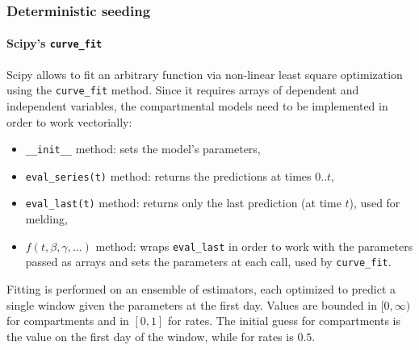 \documentclass[aspectratio=43]{beamer}
\begin{document}
\begin{frame}
	\frametitle{Deterministic seeding}
	\framesubtitle{Scipy's \texttt{curve\_fit}}
	Scipy allows to fit an arbitrary function via non-linear least square optimization using the \texttt{curve\_fit} method.
	Since it requires arrays of dependent and independent variables, the compartmental models need to be implemented in order to work vectorially:
	\begin{itemize}
		\item \texttt{\_\_init\_\_} method: sets the model's parameters,
		\item \texttt{eval\_series(t)} method: returns the predictions at times $0..t$,
		\item \texttt{eval\_last(t)} method: returns only the last prediction (at time $t$), used for melding,
		\item \texttt{$f(t, \beta, \gamma, \dots)$} method: wraps \texttt{eval\_last} in order to work with the parameters passed as arrays and sets the parameters at each call, used by \texttt{curve\_fit}.
	\end{itemize}
	
	Fitting is performed on an ensemble of estimators, each optimized to predict a single window given the parameters at the first day. Values are bounded in $[0, \infty)$ for compartments and in $[0, 1]$ for rates. The initial guess for compartments is the value on the first day of the window, while for rates is $0.5$.
\end{frame}
\end{document}
